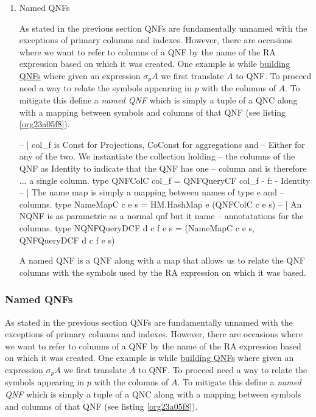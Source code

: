 \begin{enumerate}
\item Named QNFs
  \label{sec:orge07cacb}

  As stated in the previous section QNFs are fundamentally unnamed with
  the exceptions of primary columns and indexes. However, there are
  occasions where we want to refer to columns of a QNF by the name of
  the RA expression based on which it was created. One example is while
  \hyperref[sec:org3f1036f]{building QNFs} where given an expression \(\sigma_p A\) we first
  translate \(A\) to QNF. To proceed need a way to relate the symbols
  appearing in \(p\) with the columns of \(A\). To mitigate this define
  a \emph{named QNF} which is simply a tuple of a QNC along with a mapping
  between symbols and columns of that QNF (see listing \ref{org23a05f8}).

  \begin{listing}[p]
    \begin{haskell}
      -- | col_f is Const for Projections, CoConst for aggregations and
      -- Either for any of the two. We instantiate the collection holding
      -- the columns of the QNF as Identity to indicate that the QNF has one
      -- column and is therefore ... a single column.
      type QNFColC col_f = QNFQueryCF col_f {- f: -} Identity
      -- | The name map is simply a mapping between names of type e and
      -- columns.
      type NameMapC c e s = HM.HashMap e (QNFColC c e s)
      -- | An NQNF is as parametric as a normal qnf but it name
      -- annotatations for the columns.
      type NQNFQueryDCF d c f e s = (NameMapC c e s, QNFQueryDCF d c f e s)
    \end{haskell}
    \caption{\label{org23a05f8}A named QNF is a QNF along with a map that allows us to relate the QNF columns with the symbols used by the RA expression on which it was based.}
  \end{listing}
\end{enumerate}


\subsubsection{Named QNFs}
\label{sec:org0612bfe}
As stated in the previous section QNFs are fundamentally unnamed with
the exceptions of primary columns and indexes. However, there are
occasions where we want to refer to columns of a QNF by the name of
the RA expression based on which it was created. One example is while
\hyperref[sec:org3f1036f]{building QNFs} where given an expression \(\sigma_p A\) we first
translate \(A\) to QNF. To proceed need a way to relate the symbols
appearing in \(p\) with the columns of \(A\). To mitigate this define
a \emph{named QNF} which is simply a tuple of a QNC along with a mapping
between symbols and columns of that QNF (see listing \ref{org23a05f8}).

